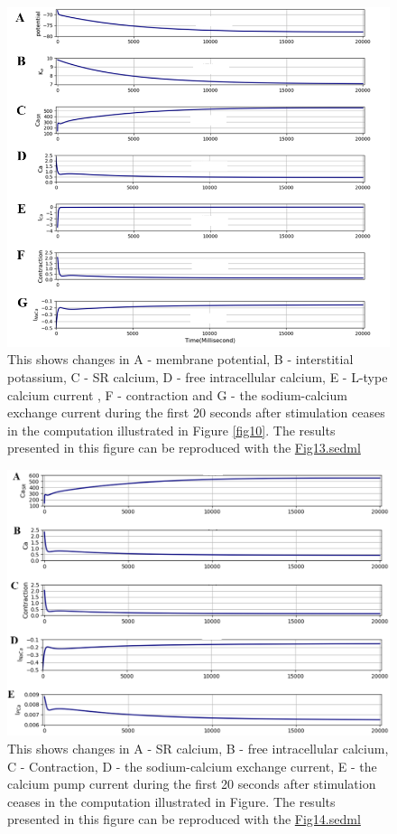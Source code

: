 \documentclass[fleqn,10pt]{physiome}
\begin{document}
\begin{figure}[h!]
\centering
\includegraphics[width=0.7\linewidth]{figure12}
\caption{This shows changes in A - membrane potential, B - interstitial potassium, C - SR calcium, D - free intracellular calcium, E - L-type calcium current , F - contraction and G - the sodium-calcium exchange current during the first 20 seconds after stimulation ceases in the computation illustrated in Figure \ref{fig10}. The results presented in this figure can be reproduced with the \href{https://models.physiomeproject.org/workspace/5f4/file/26289d9227fbf4f66ca8106d8bf80ff9a51a5ac6/Fig13.sedml}{Fig13.sedml}}
\label{fig12}
\end{figure}

\begin{figure}[h!]
\centering
\includegraphics[width=0.8\linewidth]{figure13}
\caption{This shows changes in A - SR calcium, B - free intracellular calcium, C - Contraction, D - the sodium-calcium exchange current, E - the calcium pump current during the first 20 seconds after stimulation ceases in the computation illustrated in Figure. The results presented in this figure can be reproduced with the \href{https://models.physiomeproject.org/workspace/5f4/file/26289d9227fbf4f66ca8106d8bf80ff9a51a5ac6/Fig14.sedml}{Fig14.sedml}}\newpage
\label{fig13}
\end{figure}
\end{document}
